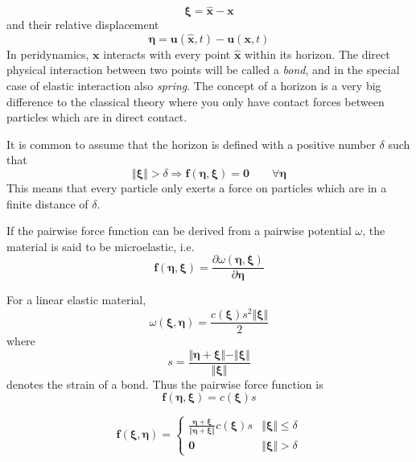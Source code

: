 \begin{equation}
\bm{\xi}=\hat{\bm{x}}-\bm{x}
\end{equation} 
and their relative displacement 
\begin{equation}
\bm{\eta}=\bm{u}(\hat{\bm{x}},t)-\bm{u}(\bm{x},t)
\end{equation}
In peridynamics, $\bm{x}$ interacts with every point $\bm{\hat{x}}$ within its horizon. The direct physical interaction between two points will be called a \textit{bond}, and in the special case of elastic interaction also \textit{spring}. The concept of a horizon is a very big difference to the classical theory where you only have contact forces between particles which are in direct contact.

It is common to assume that the horizon is defined with a positive number $\delta$ such that
\begin{equation}
\Vert \bm{\xi} \Vert > \delta \Rightarrow \bm{f}(\bm{\eta},\bm{\xi})=\bm{0} \qquad \forall \bm{\eta}
\end{equation}
This means that every particle only exerts a force on particles which are in a finite distance of $\delta$.

If the pairwise force function can be derived from a pairwise potential $\omega$, the material is said to be microelastic, i.e.
\begin{equation}
\bm{f}(\bm{\eta},\bm{\xi})=\frac{\partial \omega(\bm{\eta},\bm{\xi})}{\partial \bm{\eta}}
\end{equation}

For a linear elastic material,
\begin{equation}
\omega(\bm{\xi},\bm{\eta})=\frac{c(\bm{\xi})s^2\Vert\bm{\xi}\Vert}{2}
\end{equation}
where \begin{equation}
s=\frac{\Vert\bm{\eta}+\bm{\xi}\Vert-\Vert\bm{\xi}\Vert}{\Vert\bm{\xi}\Vert}
\end{equation} denotes the strain of a bond.
Thus the pairwise force function is
\begin{equation}
\bm{f}(\bm{\eta},\bm{\xi})=c(\bm{\xi})s
\end{equation}


\begin{equation}
\bm{f}(\bm{\xi,\eta})=\begin{cases}
\frac{\bm{\eta}+\bm{\xi}}{\Vert\bm{\eta}+\bm{\xi}\Vert}c(\bm{\xi})s & \Vert\bm{\xi}\Vert\leq\delta\\
\bm{0} & \Vert\bm{\xi}\Vert>\delta
\end{cases}
\end{equation}


